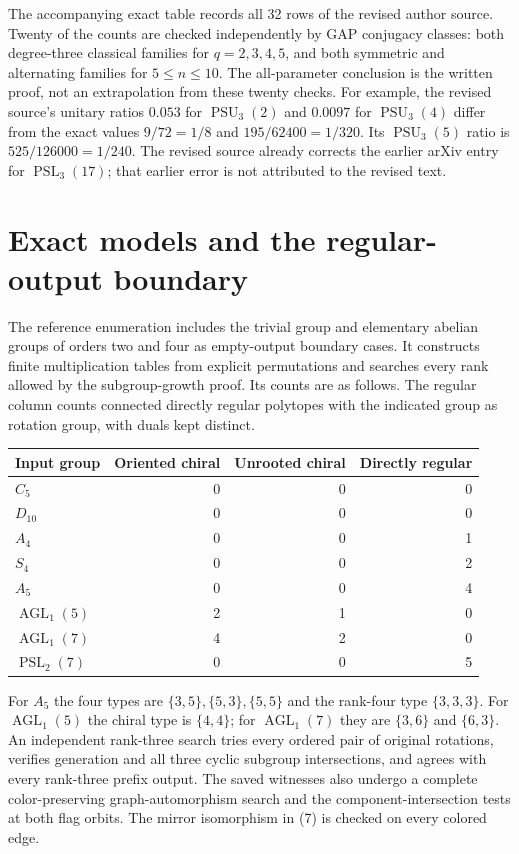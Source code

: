 \documentclass[11pt]{article}
\theoremstyle{remark}\newtheorem{remark}[theorem]{Remark}
\newcommand{\PSL}{\operatorname{PSL}}
\newcommand{\PSU}{\operatorname{PSU}}
\begin{document}
The accompanying exact table records all 32 rows of the revised author source. Twenty of the counts are checked independently by GAP conjugacy classes: both degree-three classical families for $q=2,3,4,5$, and both symmetric and alternating families for $5\leq n\leq10$. The all-parameter conclusion is the written proof, not an extrapolation from these twenty checks. For example, the revised source's unitary ratios $0.053$ for $\PSU_3(2)$ and $0.0097$ for $\PSU_3(4)$ differ from the exact values $9/72=1/8$ and $195/62400=1/320$. Its $\PSU_3(5)$ ratio is $525/126000=1/240$. The revised source already corrects the earlier arXiv entry for $\PSL_3(17)$; that earlier error is not attributed to the revised text.

\section{Exact models and the regular-output boundary}

The reference enumeration includes the trivial group and elementary abelian groups of orders two and four as empty-output boundary cases. It constructs finite multiplication tables from explicit permutations and searches every rank allowed by the subgroup-growth proof. Its counts are as follows. The regular column counts connected directly regular polytopes with the indicated group as rotation group, with duals kept distinct.
\begin{center}
\begin{tabular}{lrrr}\toprule
Input group&Oriented chiral&Unrooted chiral&Directly regular\\\midrule
$C_5$&0&0&0\\
$D_{10}$&0&0&0\\
$A_4$&0&0&1\\
$S_4$&0&0&2\\
$A_5$&0&0&4\\
$\operatorname{AGL}_1(5)$&2&1&0\\
$\operatorname{AGL}_1(7)$&4&2&0\\
$\PSL_2(7)$&0&0&5\\\bottomrule
\end{tabular}
\end{center}
For $A_5$ the four types are $\{3,5\},\{5,3\},\{5,5\}$ and the rank-four type $\{3,3,3\}$. For $\operatorname{AGL}_1(5)$ the chiral type is $\{4,4\}$; for $\operatorname{AGL}_1(7)$ they are $\{3,6\}$ and $\{6,3\}$. An independent rank-three search tries every ordered pair of original rotations, verifies generation and all three cyclic subgroup intersections, and agrees with every rank-three prefix output. The saved witnesses also undergo a complete color-preserving graph-automorphism search and the component-intersection tests at both flag orbits. The mirror isomorphism in (7) is checked on every colored edge.
\end{document}
